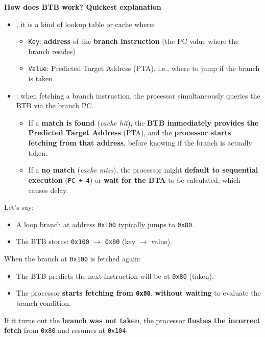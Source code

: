 \highspace
\begin{flushleft}
    \textcolor{Green3}{ \textbf{How does BTB work? Quickest explanation}}
\end{flushleft}
\begin{itemize}
    \item {}, it is a kind of lookup table or cache where:
    \begin{itemize}
        \item \texttt{Key}: \textbf{address} of the \textbf{branch instruction} (the PC value where the branch resides)
        \item \texttt{Value}: Predicted Target Address (PTA), i.e., where to jump if the branch is taken
    \end{itemize}

    \item {}: when fetching a branch instruction, the processor simultaneously queries the BTB via the branch PC.
    \begin{itemize}
        \item[\textcolor{Green3}{\faIcon{check}}] If a \textcolor{Green3}{\textbf{match is found}} (\emph{cache hit}), the \textbf{BTB immediately provides the Predicted Target Address} (PTA), and the \textbf{processor starts fetching from that address}, before knowing if the branch is actually taken.
        \item[\textcolor{Red2}{\faIcon{times}}] If a \textcolor{Red2}{\textbf{no match}} (\emph{cache miss}), the processor might \textbf{default to sequential execution} (\texttt{PC + 4}) or \textbf{wait for the BTA} to be calculated, which causes delay.
    \end{itemize}
\end{itemize}

\begin{examplebox}
    Let's say:
    \begin{itemize}
        \item A loop branch at address \texttt{0x100} typically jumps to \texttt{0x80}.
        \item The BTB stores: \texttt{0x100} $\rightarrow$ \texttt{0x80} (key $\rightarrow$ value).
    \end{itemize}
    When the branch at \texttt{0x100} is fetched again:
    \begin{itemize}
        \item The BTB predicts the next instruction will be at \texttt{0x80} (taken).
        \item The processor \textbf{starts fetching from \texttt{0x80}}, \textbf{without waiting} to evaluate the branch condition.
    \end{itemize}
    If it turns out the \textbf{branch was not taken}, the processor \textbf{flushes the incorrect fetch} from \texttt{0x80} and resumes at \texttt{0x104}.
\end{examplebox}

